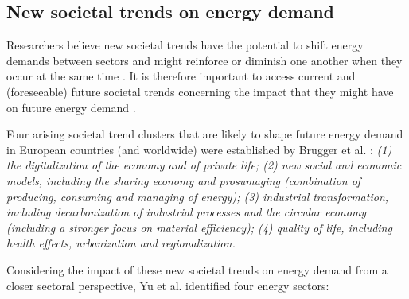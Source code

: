 \subsection{New societal trends on energy demand}


Researchers believe new societal trends have the potential to shift energy demands between sectors and might reinforce or diminish one another when they occur at the same time \cite{2050}. 
It is therefore important to access current and (foreseeable) future societal trends concerning the impact that they might have on future energy demand \cite{2050}. 

Four arising societal trend clusters that are likely to shape future energy demand in European countries (and worldwide) were established by Brugger et al. \cite{2050}:  
\emph{
  (1) the digitalization of the economy and of private life; 
  (2) new social and economic models, including the sharing economy and prosumaging (combination of producing, consuming and managing of energy); 
  (3) industrial transformation, including decarbonization of industrial processes and the circular economy (including a stronger focus on material efficiency); 
  (4) quality of life, including health effects, urbanization and regionalization. 
}


Considering the impact of these new societal trends on energy demand from a closer sectoral perspective,
Yu et al. \cite{newtrends} identified four energy sectors: 

